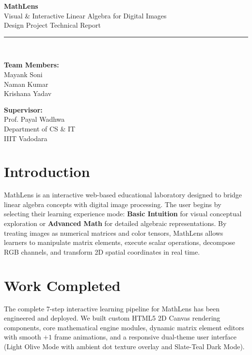 \documentclass[11pt,a4paper]{article}
\begin{document}
\begin{center}
    {\Huge \textbf{MathLens}}\\[0.2cm]
    {\Large Visual \& Interactive Linear Algebra for Digital Images}\\[0.3cm]
    {\large Design Project Technical Report}\\[0.4cm]
    
    \rule{\linewidth}{0.4mm}\\[0.4cm]
    
    \noindent
    \begin{minipage}[t]{0.48\textwidth}
        \raggedright \small
        \textbf{Team Members:}\\[0.15cm]
        Mayank Soni\\
        Naman Kumar\\
        Krishana Yadav
    \end{minipage}%
    \hfill
    \begin{minipage}[t]{0.48\textwidth}
        \raggedleft \small
        \textbf{Supervisor:}\\[0.15cm]
        Prof. Payal Wadhwa\\
        Department of CS \& IT\\
        IIIT Vadodara
    \end{minipage}
\end{center}

\vspace{0.3cm}

\section{Introduction}
MathLens is an interactive web-based educational laboratory designed to bridge linear algebra concepts with digital image processing. The user begins by selecting their learning experience mode: \textbf{Basic Intuition} for visual conceptual exploration or \textbf{Advanced Math} for detailed algebraic representations. By treating images as numerical matrices and color tensors, MathLens allows learners to manipulate matrix elements, execute scalar operations, decompose RGB channels, and transform 2D spatial coordinates in real time.

\section{Work Completed}
The complete 7-step interactive learning pipeline for MathLens has been engineered and deployed. We built custom HTML5 2D Canvas rendering components, core mathematical engine modules, dynamic matrix element editors with smooth $+1$ frame animations, and a responsive dual-theme user interface (Light Olive Mode with ambient dot texture overlay and Slate-Teal Dark Mode).
\end{document}
